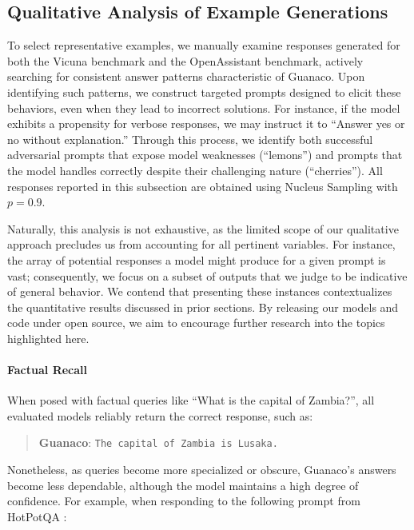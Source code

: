 \subsection{Qualitative Analysis of Example Generations}
\label{ssec:examples}

To select representative examples, we manually examine responses generated for both the Vicuna benchmark and the OpenAssistant benchmark, actively searching for consistent answer patterns characteristic of {Guanaco}. Upon identifying such patterns, we construct targeted prompts designed to elicit these behaviors, even when they lead to incorrect solutions. For instance, if the model exhibits a propensity for verbose responses, we may instruct it to ``Answer yes or no without explanation.'' Through this process, we identify both successful adversarial prompts that expose model weaknesses (``lemons'') and prompts that the model handles correctly despite their challenging nature (``cherries''). All responses reported in this subsection are obtained using Nucleus Sampling \cite{holtzmancurious} with $p=0.9$.

Naturally, this analysis is not exhaustive, as the limited scope of our qualitative approach precludes us from accounting for all pertinent variables. For instance, the array of potential responses a model might produce for a given prompt is vast; consequently, we focus on a subset of outputs that we judge to be indicative of general behavior. We contend that presenting these instances contextualizes the quantitative results discussed in prior sections. By releasing our models and code under open source, we aim to encourage further research into the topics highlighted here.

\paragraph{Factual Recall} When posed with factual queries like ``What is the capital of Zambia?'', all evaluated models reliably return the correct response, such as:

\begin{quote}
    \textbf{Guanaco}:
    \texttt{The capital of Zambia is Lusaka.}
\end{quote}

Nonetheless, as queries become more specialized or obscure, {Guanaco}'s answers become less dependable, although the model maintains a high degree of confidence. For example, when responding to the following prompt from HotPotQA \citep{yang2018hotpotqa}:

